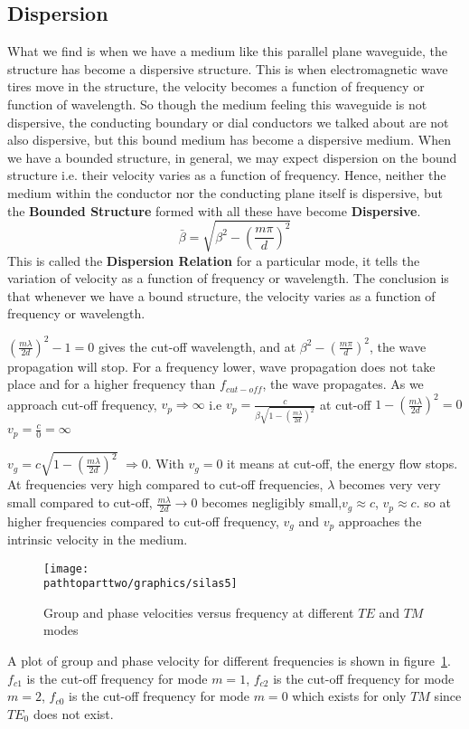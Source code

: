 \subsection{Dispersion}
What we find is when we have a medium like this parallel plane waveguide, the structure has become a dispersive structure. This is when electromagnetic wave tires move in the structure, the velocity becomes a function of frequency or function of wavelength. So though the medium feeling this waveguide is not dispersive, the conducting boundary or dial conductors we talked about are not also dispersive, but this bound medium has become a dispersive medium. When we have a bounded structure, in general, we may expect dispersion on the bound structure i.e. their velocity varies as a function of frequency. Hence, neither the medium within the conductor nor the conducting plane itself is dispersive, but the \textbf{Bounded Structure} formed with all these have become \textbf{Dispersive}.
\begin{equation}
\bar{\beta} = \sqrt{\beta^{2} -\left(\frac{m\pi}{d}\right)^{2}}
\end{equation} 
This is called the \textbf{Dispersion Relation} for a particular mode, it tells the variation of velocity as a function of frequency or wavelength. The conclusion is that whenever we have a bound structure, the velocity varies as a function of frequency or wavelength.

$(\frac{m\lambda}{2d})^{2} -1=0$ gives the cut-off wavelength, and at $\beta^{2} -(\frac{m\pi}{d})^{2}$, the wave propagation will stop. For a frequency lower, wave propagation does not take place and for a higher frequency than $f_{cut-off}$, the wave propagates. As we approach cut-off frequency, $v_{p}\Rightarrow \infty$ i.e $v_{p}= \frac{c}{\beta \sqrt{1- \left(\frac{m \lambda}{2d}\right)^{2}}}$ at cut-off $1 - (\frac{m\lambda}{2d})^{2}=0$ $v_{p} =\frac{c}{0} =\infty$

$v_{g} =c \sqrt{1-(\frac{m\lambda}{2d})^{2}}$ $\Rightarrow 0$. With $v_{g} = 0$ it means at cut-off, the energy flow stops. At frequencies very high compared to cut-off frequencies, $\lambda$ becomes very very small compared to cut-off, $\frac{m\lambda}{2d} \rightarrow 0$ becomes negligibly small,$v_{g} \approx c$, $v_{p} \approx c$. so at higher frequencies compared to cut-off frequency, $v_{g}$ and $v_{p}$ approaches the intrinsic velocity in the medium.
\begin{figure}[h]
\centering
\texttt{[image: \\pathtoparttwo/graphics/silas5]}
\caption{Group and phase velocities versus frequency at different $TE$ and $TM$ modes}
\label{fig:silas5}
\end{figure}
A plot of group and phase velocity for different frequencies is shown in figure~\ref{fig:silas5}. $f_{c1}$ is the cut-off frequency for mode $m=1$, $f_{c2}$ is the cut-off frequency for mode $m=2$, $f_{c0}$ is the cut-off frequency for mode $m=0$ which exists for only $TM$ since $TE_0$ does not exist.

